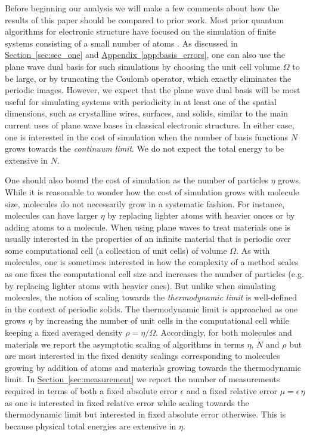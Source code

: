 \documentclass[superscriptaddress,aps,pra,nofootinbib,notitlepage,10pt,longbibliography]{revtex4-1}
\renewcommand{\sec}[1]{\hyperref[sec:#1]{Section~\ref*{sec:#1}}}
\DeclareRobustCommand{\app}[1]{\hyperref[app:#1]{Appendix~\ref*{app:#1}}}
\begin{document}
Before beginning our analysis we will make a few comments about how the results of this paper should be compared to prior work. Most prior quantum algorithms for electronic structure have focused on the simulation of finite systems consisting of a small number of atoms \cite{Aspuru-Guzik2005}. As discussed in \sec{sec_one} and \app{basis_errors}, one can also use the plane wave dual basis for such simulations by choosing the unit cell volume $\Omega$ to be large, or by truncating the Coulomb operator, which exactly eliminates
the periodic images. However, we expect that the plane wave dual basis will be most useful for simulating systems with
periodicity in at least one of the spatial dimensions, such as crystalline wires, surfaces, and solids, similar to the
main current uses of plane wave bases in classical electronic structure. In either case, one is interested in the cost of simulation when the number of basis functions $N$ grows towards the \emph{continuum limit}. We do not expect the total energy to be extensive in $N$.

One should also bound the cost of simulation as the number of particles $\eta$ grows. While it is reasonable to wonder how the cost of simulation grows with molecule size, molecules do not necessarily grow in a systematic fashion. For instance, molecules can have larger $\eta$ by replacing lighter atoms with heavier onces or by adding atoms to a molecule. When using plane waves to treat materials one is usually interested in the properties of an infinite material that is periodic over some computational cell (a collection of unit cells) of volume $\Omega$. As with molecules, one is sometimes interested in how the complexity of a method scales as one fixes the computational cell size and increases the number of particles (e.g. by replacing lighter atoms with heavier ones). But unlike when simulating molecules, the notion of scaling towards the \emph{thermodynamic limit} is well-defined in the context of periodic solids. The thermodynamic limit is approached as one grows $\eta$ by increasing the number of unit cells in the computational cell while keeping a fixed averaged density $\rho = \eta / \Omega$. Accordingly, for both molecules and materials we report the asymptotic scaling of algorithms in terms $\eta$, $N$ and $\rho$ but are most interested in the fixed density scalings corresponding to molecules growing by addition of atoms and materials growing towards the thermodynamic limit. In \sec{measurement} we report the number of measurements required in terms of both a fixed absolute error $\epsilon$  and a fixed relative error $\mu = \epsilon\, \eta$ as one is interested in fixed relative error while scaling towards the thermodynamic limit but interested in fixed absolute error otherwise. This is because physical total energies are extensive in $\eta$.
\end{document}
